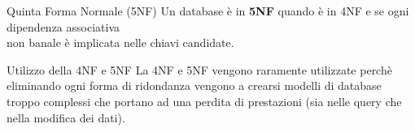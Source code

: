 %
\begin{frame}{Quinta Forma Normale (5NF)}
    Un database \`e in \textbf{5NF} quando \`e in 4NF e se ogni dipendenza associativa \\non banale \`e implicata nelle chiavi candidate.
\end{frame}
%
\begin{frame}{Utilizzo della 4NF e 5NF}
    La 4NF e 5NF vengono raramente utilizzate perch\`e eliminando ogni forma di ridondanza vengono a crearsi modelli di database troppo complessi che portano ad una perdita di prestazioni (sia nelle query che nella modifica dei dati).
\end{frame}
